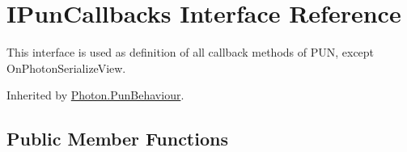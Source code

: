 \hypertarget{interface_i_pun_callbacks}{}\section{I\+Pun\+Callbacks Interface Reference}
\label{interface_i_pun_callbacks}


This interface is used as definition of all callback methods of P\+UN, except On\+Photon\+Serialize\+View.  




Inherited by \hyperlink{class_photon_1_1_pun_behaviour}{Photon.\+Pun\+Behaviour}.

\subsection*{Public Member Functions}

